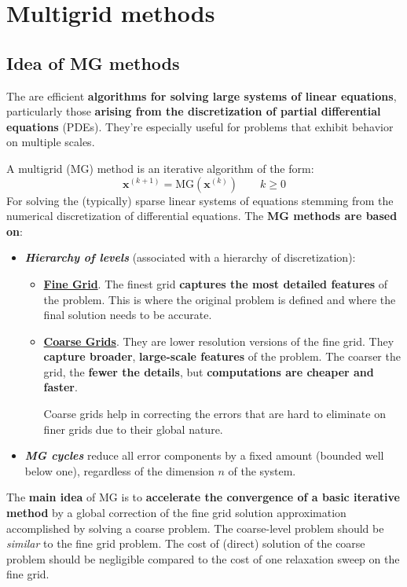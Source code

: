 \section{Multigrid methods}

\subsection{Idea of MG methods}

The  are efficient \textbf{algorithms for solving large systems of linear equations}, particularly those \textbf{arising from the discretization of partial differential equations} (PDEs). They're especially useful for problems that exhibit behavior on multiple scales.

\highspace
A multigrid (MG) method is an iterative algorithm of the form:
\begin{equation}
    \mathbf{x}^{\left(k+1\right)} = \mathrm{MG}\left(\mathbf{x}^{\left(k\right)}\right) \hspace{2em} k \ge 0
\end{equation}
For solving the (typically) sparse linear systems of equations stemming from the numerical discretization of differential equations. The \textbf{MG methods are based on}:
\begin{itemize}
    \item \textbf{\emph{Hierarchy of levels}} (associated with a hierarchy of discretization):
    \begin{itemize}
        \item \textbf{\underline{Fine Grid}}. The finest grid \textbf{captures the most detailed features} of the problem. This is where the original problem is defined and where the final solution needs to be accurate.
        
        \item \textbf{\underline{Coarse Grids}}. They are lower resolution versions of the fine grid. They \textbf{capture broader}, \textbf{large-scale features} of the problem. The coarser the grid, the \textbf{fewer the details}, but \textbf{computations are cheaper and faster}.
        
        Coarse grids help in correcting the errors that are hard to eliminate on finer grids due to their global nature.
    \end{itemize}

    \item \textbf{\emph{MG cycles}} reduce all error components by a fixed amount (bounded well below one), regardless of the dimension $n$ of the system.
\end{itemize}
The \textbf{main idea} of MG is to \textbf{accelerate the convergence of a basic iterative method} by a global correction of the fine grid solution approximation accomplished by solving a coarse problem. The coarse-level problem should be \emph{similar} to the fine grid problem. The cost of (direct) solution of the coarse problem should be negligible compared to the cost of one relaxation sweep on the fine grid.

